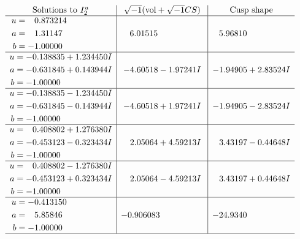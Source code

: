 \documentclass[1p]{elsarticle_modified}
\theoremstyle{definition}
\newcommand{\I}{\sqrt{-1}}
\begin{document}
$$\begin{array}{c|c|c}  
\text{Solutions to }I^u_{2}& \I (\text{vol} + \sqrt{-1}CS) & \text{Cusp shape}\\
 \hline 
\begin{aligned}
u &= \phantom{-}0.873214\phantom{ +0.000000I} \\
a &= \phantom{-}1.31147\phantom{ +0.000000I} \\
b &= -1.00000\phantom{ +0.000000I}\end{aligned}
 & \phantom{-}6.01515\phantom{ +0.000000I} & \phantom{-}5.96810\phantom{ +0.000000I} \\ \hline\begin{aligned}
u &= -0.138835 + 1.234450 I \\
a &= -0.631845 + 0.143944 I \\
b &= -1.00000\phantom{ +0.000000I}\end{aligned}
 & -4.60518 - 1.97241 I & -1.94905 + 2.83524 I \\ \hline\begin{aligned}
u &= -0.138835 - 1.234450 I \\
a &= -0.631845 - 0.143944 I \\
b &= -1.00000\phantom{ +0.000000I}\end{aligned}
 & -4.60518 + 1.97241 I & -1.94905 - 2.83524 I \\ \hline\begin{aligned}
u &= \phantom{-}0.408802 + 1.276380 I \\
a &= -0.453123 - 0.323434 I \\
b &= -1.00000\phantom{ +0.000000I}\end{aligned}
 & \phantom{-}2.05064 + 4.59213 I & \phantom{-}3.43197 - 0.44648 I \\ \hline\begin{aligned}
u &= \phantom{-}0.408802 - 1.276380 I \\
a &= -0.453123 + 0.323434 I \\
b &= -1.00000\phantom{ +0.000000I}\end{aligned}
 & \phantom{-}2.05064 - 4.59213 I & \phantom{-}3.43197 + 0.44648 I \\ \hline\begin{aligned}
u &= -0.413150\phantom{ +0.000000I} \\
a &= \phantom{-}5.85846\phantom{ +0.000000I} \\
b &= -1.00000\phantom{ +0.000000I}\end{aligned}
 & -0.906083\phantom{ +0.000000I} & -24.9340\phantom{ +0.000000I}\\
 \hline 
 \end{array}$$\newpage
\end{document}
